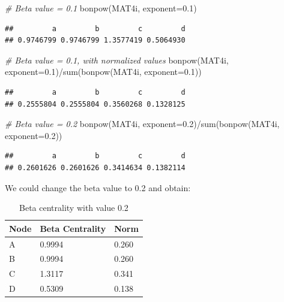 \documentclass[
  notitlepage,
  onecolumn,
  openany]{book}
\newenvironment{Shaded}{\begin{snugshade}}{\end{snugshade}}
\newcommand{\AttributeTok}[1]{\textcolor[rgb]{0.77,0.63,0.00}{#1}}
\newcommand{\CommentTok}[1]{\textcolor[rgb]{0.56,0.35,0.01}{\textit{#1}}}
\newcommand{\FloatTok}[1]{\textcolor[rgb]{0.00,0.00,0.81}{#1}}
\newcommand{\FunctionTok}[1]{\textcolor[rgb]{0.00,0.00,0.00}{#1}}
\newcommand{\NormalTok}[1]{#1}
\newcommand{\SpecialCharTok}[1]{\textcolor[rgb]{0.00,0.00,0.00}{#1}}
\begin{document}
\begin{Shaded}
\begin{Highlighting}[]
\CommentTok{\# Beta value = 0.1}
\FunctionTok{bonpow}\NormalTok{(MAT4i, }\AttributeTok{exponent=}\FloatTok{0.1}\NormalTok{)}
\end{Highlighting}
\end{Shaded}

\begin{verbatim}
##         a         b         c         d 
## 0.9746799 0.9746799 1.3577419 0.5064930
\end{verbatim}

\begin{Shaded}
\begin{Highlighting}[]
\CommentTok{\# Beta value = 0.1, with normalized values}
\FunctionTok{bonpow}\NormalTok{(MAT4i, }\AttributeTok{exponent=}\FloatTok{0.1}\NormalTok{)}\SpecialCharTok{/}\FunctionTok{sum}\NormalTok{(}\FunctionTok{bonpow}\NormalTok{(MAT4i, }\AttributeTok{exponent=}\FloatTok{0.1}\NormalTok{))}
\end{Highlighting}
\end{Shaded}

\begin{verbatim}
##         a         b         c         d 
## 0.2555804 0.2555804 0.3560268 0.1328125
\end{verbatim}

\begin{Shaded}
\begin{Highlighting}[]
\CommentTok{\# Beta value = 0.2}
\FunctionTok{bonpow}\NormalTok{(MAT4i, }\AttributeTok{exponent=}\FloatTok{0.2}\NormalTok{)}\SpecialCharTok{/}\FunctionTok{sum}\NormalTok{(}\FunctionTok{bonpow}\NormalTok{(MAT4i, }\AttributeTok{exponent=}\FloatTok{0.2}\NormalTok{))}
\end{Highlighting}
\end{Shaded}

\begin{verbatim}
##         a         b         c         d 
## 0.2601626 0.2601626 0.3414634 0.1382114
\end{verbatim}

We could change the beta value to 0.2 and obtain:

\begin{table}[h]
\centering
\begin{tabular}{@{}lll@{}}
\toprule
\textbf{Node} & \textbf{Beta Centrality} & \textbf{Norm} \\ \midrule
A             & 0.9994                   & 0.260         \\
B             & 0.9994                   & 0.260         \\
C             & 1.3117                   & 0.341         \\
D             & 0.5309                   & 0.138         \\ \bottomrule
\end{tabular}
\caption{Beta centrality with \beta value 0.2}
\label{tab:my-table}
\end{table}
\end{document}

